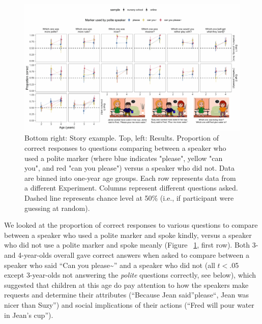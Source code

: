 \documentclass[10pt, letterpaper]{article}
\newenvironment{CodeChunk}{}{}
\begin{document}
\begin{CodeChunk}
\captionsetup{width=0.8\textwidth}\begin{figure}[h]

{\centering \includegraphics{figs/fig_results_placement-1} 

}

\caption[Bottom right]{Bottom right: Story example. Top, left: Results. Proportion of correct responses to questions comparing between a speaker who used a polite marker (where blue indicates "please", yellow "can you", and red "can you please") versus a speaker who did not. Data are binned into one-year age groups. Each row represents data from a different Experiment. Columns represent different questions asked. Dashed line represents chance level at 50\% (i.e., if participant were guessing at random).}\label{fig:fig_results_placement}
\end{figure}
\end{CodeChunk}

We looked at the proportion of correct responses to various questions to
compare between a speaker who used a polite marker and spoke kindly,
versus a speaker who did not use a polite marker and spoke meanly
(Figure ~\ref{fig:fig_results_placement}, first row). Both 3- and
4-year-olds overall gave correct answers when asked to compare between a
speaker who said ``Can you please\textasciitilde{}'' and a speaker who
did not (all \(t<\).05 except 3-year-olds not answering the
\emph{polite} questions correctly, see below), which suggested that
children at this age do pay attention to how the speakers make requests
and determine their attributes (``Because Jean said''please``, Jean was
nicer than Suzy'') and social implications of their actions (``Fred will
pour water in Jean's cup'').
\end{document}
